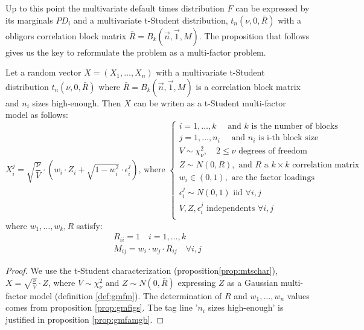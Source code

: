 \documentclass[11pt,fleqn]{book} %
\begin{document}
Up to this point the multivariate default times distribution $F$ can 
be expressed by its marginals $PD_i$ and a multivariate t-Student 
distribution, $t_n(\nu,0,\bar{R})$ with a obligors correlation block 
matrix $\bar{R} = B_k(\vec{n},\vec{1},M)$. The proposition that follows 
gives us the key to reformulate the problem as a multi-factor problem.


\begin{proposition}
	Let a random vector $X=(X_1,\dots,X_n)$ with a multivariate t-Student 
	distribution $t_n(\nu,0,\bar{R})$ where $\bar{R} = B_k(\vec{n},\vec{1},M)$ 
	is a correlation block matrix and $n_i$ sizes high-enough. 
	Then $X$ can be writen as a t-Student multi-factor model as follows:
	\begin{displaymath}
		X_i^j = \sqrt{\frac{\nu}{V}} \cdot 
		\left( w_i \cdot Z_i + \sqrt{1-w_i^2} \cdot \epsilon_i^j \right)
		\text{, where } \left\{
		\begin{array}{l}
			i = 1, \dots, k \quad \text{ and $k$ is the number of blocks}    \\
			j = 1, \dots, n_i \quad \text{ and $n_i$ is i-th block size}     \\
			V \sim \chi_{\nu}^2, \quad 2 \le \nu \text{ degrees of freedom}  \\
			Z \sim N(0,R), \text{ and $R$ a $k {\times} k$ correlation matrix} \\
			w_i \in (0,1), \text{ are the factor loadings }                  \\
			\epsilon_i^j \sim N(0,1) \text { iid } \forall i,j               \\
			V, Z, \epsilon_i^j \text{ independents } \forall i,j             \\
		\end{array}
		\right.
	\end{displaymath}
	where $w_1,\dots,w_k, R$ satisfy:
	\begin{displaymath}
		\begin{array}{l}
			R_{ii} = 1 \quad i = 1,\dots,k \\
			M_{ij} = w_i \cdot w_j \cdot R_{ij} \quad \forall i,j
		\end{array}
	\end{displaymath}
\end{proposition}
\begin{proof}
	We use the t-Student characterization (proposition\ref{prop:mtschar}),
	$X = \sqrt{\frac{\nu}{V}} \cdot Z$, where $V \sim \chi_{\nu}^2$ and 
	$Z \sim N(0,\bar{R})$ expressing $Z$ as a Gaussian multi-factor model 
	(definition \ref{def:gmfm}). The determination of $R$ and $w_1,\dots,w_n$
	values comes from proposition \ref{prop:gmfigs}. The tag line '$n_i$ sizes
	high-enough' is justified in proposition \ref{prop:gmfamgb}.
\end{proof}
\end{document}
